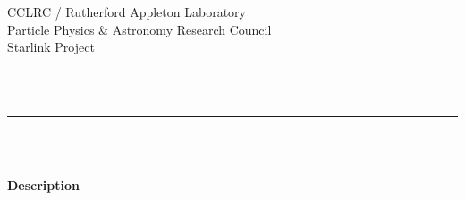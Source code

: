 \newcommand{\fitsurl}[0]{http://www.gsfc.nasa.gov/astro/fits/fits_home.html}

\renewcommand{\thepage}{\roman{page}}

\thispagestyle{empty}

\begin{latexonly}
   CCLRC / {\sc Rutherford Appleton Laboratory} \hfill {\bf \stardocname}\\
   {\large Particle Physics \& Astronomy Research Council}\\
   {\large Starlink Project\\}
   {\large \stardoccategory\ \stardocnumber}
   \begin{flushright}
   \stardocauthors\\
   \stardocdate
   \end{flushright}
   \vspace{-4mm}
   \rule{\textwidth}{0.5mm}
   \vspace{5mm}
   \begin{center}
   {\Huge\bf  \stardoctitle \\ [2.5ex]}
   {\LARGE\bf \stardocversion \\ [4ex]}
   {\Huge\bf  \stardocmanual}
   \end{center}
   \vspace{15mm}

   \vspace{10mm}
   \begin{center}
      {\Large\bf Description}
   \end{center}
\end{latexonly}

